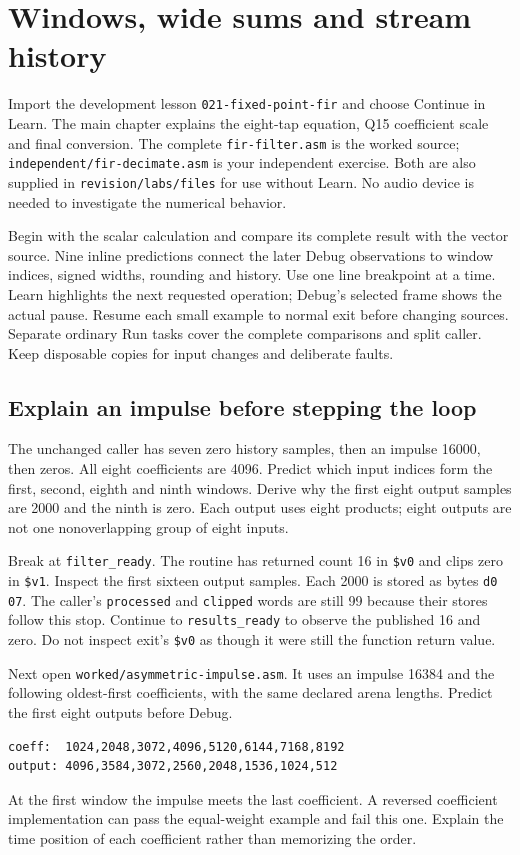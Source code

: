 \chapter{Windows, wide sums and stream history}
\label{revision-lab:fir}

Import the development lesson \texttt{021-fixed-point-fir} and choose Continue
in Learn. The main chapter explains the eight-tap equation, Q15 coefficient scale
and final conversion. The complete \texttt{fir-filter.asm} is the worked source;
\texttt{independent/fir-decimate.asm} is your independent exercise. Both are also
supplied in \texttt{revision/labs/files} for use without Learn. No audio device
is needed to investigate the numerical behavior.

Begin with the scalar calculation and compare its complete result with the vector
source. Nine inline predictions connect the later Debug observations to window
indices, signed widths, rounding and history. Use one line breakpoint at a time.
Learn highlights the next requested operation; Debug's selected frame shows the
actual pause. Resume each small example to normal exit before changing sources.
Separate ordinary Run tasks cover the complete comparisons and split caller.
Keep disposable copies for input changes and deliberate faults.

\section{Explain an impulse before stepping the loop}

The unchanged caller has seven zero history samples, then an impulse 16000,
then zeros. All eight coefficients are 4096. Predict which input indices form
the first, second, eighth and ninth windows. Derive why the first eight output
samples are 2000 and the ninth is zero. Each output uses eight products; eight
outputs are not one nonoverlapping group of eight inputs.

Break at \texttt{filter\_ready}. The routine has returned count 16 in
\texttt{\$v0} and clips zero in \texttt{\$v1}. Inspect the first sixteen
output samples. Each 2000 is stored as bytes \texttt{d0 07}. The caller's
\texttt{processed} and \texttt{clipped} words are still 99 because their stores
follow this stop. Continue to \texttt{results\_ready} to observe the published
16 and zero. Do not inspect exit's \texttt{\$v0} as though it were still the
function return value.

Next open \texttt{worked/asymmetric-impulse.asm}. It uses an impulse 16384 and
the following oldest-first coefficients, with the same declared arena lengths.
Predict the first eight outputs before Debug.
\begin{verbatim}
coeff:  1024,2048,3072,4096,5120,6144,7168,8192
output: 4096,3584,3072,2560,2048,1536,1024,512
\end{verbatim}
At the first window the impulse meets the last coefficient. A reversed
coefficient implementation can pass the equal-weight example and fail this one.
Explain the time position of each coefficient rather than memorizing the order.

